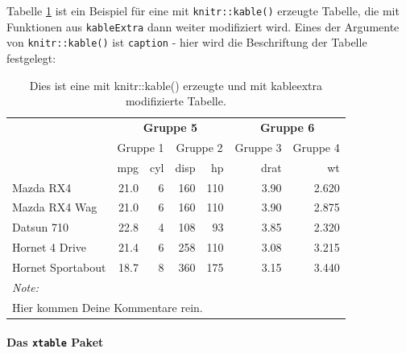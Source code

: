 \documentclass[a4paper,12pt]{article}
\begin{document}
Tabelle \ref{tab:kable1} ist ein Beispiel für eine mit \texttt{knitr::kable()} erzeugte Tabelle, die mit Funktionen aus \texttt{kableExtra} dann weiter modifiziert wird. Eines der Argumente von \texttt{knitr::kable()} ist \texttt{caption} - hier wird die Beschriftung der Tabelle festgelegt:
\begin{table}

\caption{\label{tab:kable1}Dies ist eine mit knitr::kable() erzeugte und mit kableextra modifizierte Tabelle.}
\centering
\fontsize{9}{11}\selectfont
\begin{tabular}[t]{lrrrrrr}
\toprule
\multicolumn{1}{c}{\textbf{ }} & \multicolumn{4}{c}{\textbf{Gruppe 5}} & \multicolumn{2}{c}{\textbf{Gruppe 6}} \\
\cmidrule(l{3pt}r{3pt}){2-5} \cmidrule(l{3pt}r{3pt}){6-7}
\multicolumn{1}{c}{ } & \multicolumn{2}{c}{Gruppe 1} & \multicolumn{2}{c}{Gruppe 2} & \multicolumn{1}{c}{Gruppe 3} & \multicolumn{1}{c}{Gruppe 4} \\
\cmidrule(l{3pt}r{3pt}){2-3} \cmidrule(l{3pt}r{3pt}){4-5} \cmidrule(l{3pt}r{3pt}){6-6} \cmidrule(l{3pt}r{3pt}){7-7}
  & mpg & cyl & disp & hp & drat & wt\\
\midrule
Mazda RX4 & 21.0 & 6 & 160 & 110 & 3.90 & 2.620\\
Mazda RX4 Wag & 21.0 & 6 & 160 & 110 & 3.90 & 2.875\\
Datsun 710 & 22.8 & 4 & 108 & 93 & 3.85 & 2.320\\
Hornet 4 Drive & 21.4 & 6 & 258 & 110 & 3.08 & 3.215\\
Hornet Sportabout & 18.7 & 8 & 360 & 175 & 3.15 & 3.440\\
\bottomrule
\multicolumn{7}{l}{\textit{Note: }}\\
\multicolumn{7}{l}{Hier kommen Deine Kommentare rein.}\\
\end{tabular}
\end{table}
\hypertarget{das-xtable-paket}{%
\paragraph{\texorpdfstring{Das \texttt{xtable} Paket}{Das xtable Paket}}\label{das-xtable-paket}}

~
\end{document}
